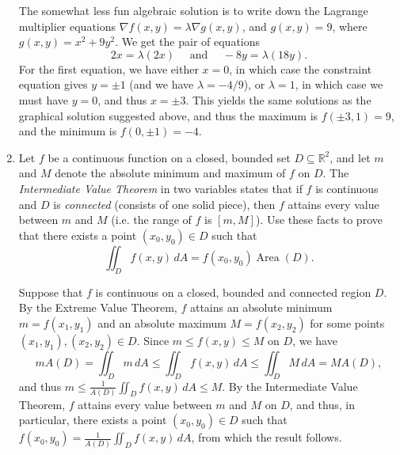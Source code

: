 \documentclass[12pt]{article}
\newcommand{\points}[1]{\marginpar{\hspace{24pt}[#1]}}
\newcommand{\di}{\displaystyle}
\DeclareMathOperator{\area}{Area}
\begin{document}
\begin{enumerate}
\medskip

The somewhat less fun algebraic solution is to write down the Lagrange multiplier equations $\nabla f(x,y) = \lambda \nabla g(x,y)$, and $g(x,y)=9$, where $g(x,y) = x^2+9y^2$. We get the pair of equations
\[
 2x = \lambda (2x) \quad \text{ and } \quad -8y = \lambda(18y).
\]
For the first equation, we have either $x=0$, in which case the constraint equation gives $y=\pm 1$ (and we have $\lambda = -4/9$), or $\lambda =1$, in which case we must have $y=0$, and thus $x=\pm 3$. This yields the same solutions as the graphical solution suggested above, and thus the maximum is $f(\pm 3,1)=9$, and the minimum is $f(0,\pm 1) = -4$.

\bigskip

\newpage

\item Let $f$ be a continuous function on a closed, bounded set $D\subseteq \mathbb{R}^2$, and let $m$ and $M$ denote the absolute minimum and maximum of $f$ on $D$. The {\em Intermediate Value Theorem} in two variables states that if $f$ is continuous and $D$ is {\em connected} (consists of one solid piece), then $f$ attains every value between $m$ and $M$ (i.e. the range of $f$ is $[m,M]$). Use these facts to prove that there exists a point $(x_0,y_0)\in D$ such that\points{4}
\[
\iint_D f(x,y)\,dA = f(x_0,y_0)\area(D). 
\]
 
\bigskip

Suppose that $f$ is continuous on a closed, bounded and connected region $D$. By the Extreme Value Theorem, $f$ attains an absolute minimum $m = f(x_1,y_1)$ and an absolute maximum $M=f(x_2,y_2)$ for some points $(x_1,y_1), (x_2,y_2)\in D$. Since $m\leq f(x,y)\leq M$ on $D$, we have
\[
 mA(D) = \iint_D m\, dA\leq \iint_D f(x,y)\,dA \leq \iint_D M\, dA = MA(D),
\]
and thus $\di m\leq \frac{1}{A(D)}\iint_D f(x,y)\, dA \leq M$. By the Intermediate Value Theorem, $f$ attains every value between $m$ and $M$ on $D$, and thus, in particular, there exists a point $(x_0,y_0)\in D$ such that $\di f(x_0,y_0) = \frac{1}{A(D)}\iint_D f(x,y)\,dA$, from which the result follows.

\end{enumerate}
\end{document}
